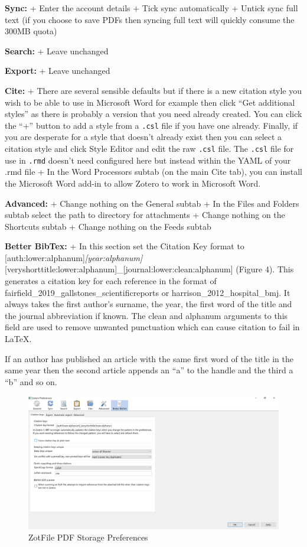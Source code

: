 \documentclass[
]{book}
\begin{document}
\textbf{Sync:}
+ Enter the account details
+ Tick sync automatically
+ Untick sync full text (if you choose to save PDFs then syncing full text will quickly consume the 300MB quota)

\textbf{Search:}
+ Leave unchanged

\textbf{Export:}
+ Leave unchanged

\textbf{Cite:}
+ There are several sensible defaults but if there is a new citation style you wish to be able to use in Microsoft Word for example then click ``Get additional styles'' as there is probably a version that you need already created. You can click the ``+'' button to add a style from a \texttt{.csl} file if you have one already. Finally, if you are desperate for a style that doesn't already exist then you can select a citation style and click Style Editor and edit the raw \texttt{.csl} file. The \texttt{.csl} file for use in \texttt{.rmd} doesn't need configured here but instead within the YAML of your .rmd file
+ In the Word Processors subtab (on the main Cite tab), you can install the Microsoft Word add-in to allow Zotero to work in Microsoft Word.

\textbf{Advanced:}
+ Change nothing on the General subtab
+ In the Files and Folders subtab select the path to directory for attachments
+ Change nothing on the Shortcuts subtab
+ Change nothing on the Feeds subtab

\textbf{Better BibTex:}
+ In this section set the Citation Key format to {[}auth:lower:alphanum{]}\emph{{[}year:alphanum{]}}{[}veryshorttitle:lower:alphanum{]}\_{[}journal:lower:clean:alphanum{]} (Figure 4). This generates a citation key for each reference in the format of fairfield\_2019\_gallstones\_scientificreports or harrison\_2012\_hospital\_bmj. It always takes the first author's surname, the year, the first word of the title and the journal abbreviation if known. The clean and alphanum arguments to this field are used to remove unwanted punctuation which can cause citation to fail in LaTeX.

If an author has published an article with the same first word of the title in the same year then the second article appends an ``a'' to the handle and the third a ``b'' and so on.

\begin{figure}
\includegraphics[width=44.42in]{img/zotero_citation_key} \caption{ZotFile PDF Storage Preferences}\label{fig:zotfile-citation-key}
\end{figure}
\end{document}
